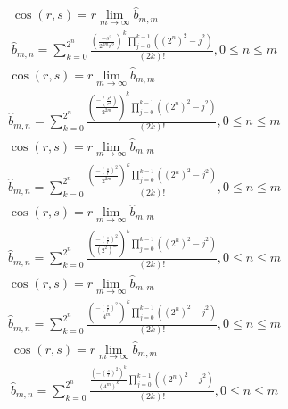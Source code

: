 \documentclass[a4paper,12pt]{report}
\begin{document}
\begin{subequations}
\begin{gather}
\cos(r,s) = r \lim \limits_{m \to \infty} \hat{b}_{m,m} \\
\hat{b}_{m,n} = \sum \limits_{k=0}^{2^n} \frac{\left(\frac{-s^2}{2^{2m}r^2}\right)^k \prod \limits_{j=0}^{k-1} ((2^n)^2 - j^2)}{(2k)!}, 0 \leq n \leq m
\end{gather}
\end{subequations}
\begin{subequations}
\begin{gather}
\cos(r,s) = r \lim \limits_{m \to \infty} \hat{b}_{m,m} \\
\hat{b}_{m,n} = \sum \limits_{k=0}^{2^n} \frac{\left(\frac{-\left(\frac{s^2}{r^2}\right)}{2^{2m}}\right)^k \prod \limits_{j=0}^{k-1} ((2^n)^2 - j^2)}{(2k)!}, 0 \leq n \leq m
\end{gather}
\end{subequations}
\begin{subequations}
\begin{gather}
\cos(r,s) = r \lim \limits_{m \to \infty} \hat{b}_{m,m} \\
\hat{b}_{m,n} = \sum \limits_{k=0}^{2^n} \frac{\left(\frac{-\left(\frac{s}{r}\right)^2}{2^{2m}}\right)^k \prod \limits_{j=0}^{k-1} ((2^n)^2 - j^2)}{(2k)!}, 0 \leq n \leq m
\end{gather}
\end{subequations}
\begin{subequations}
\begin{gather}
\cos(r,s) = r \lim \limits_{m \to \infty} \hat{b}_{m,m} \\
\hat{b}_{m,n} = \sum \limits_{k=0}^{2^n} \frac{\left(\frac{-\left(\frac{s}{r}\right)^2}{(2^2)^m}\right)^k \prod \limits_{j=0}^{k-1} ((2^n)^2 - j^2)}{(2k)!}, 0 \leq n \leq m
\end{gather}
\end{subequations}
\begin{subequations}
\begin{gather}
\cos(r,s) = r \lim \limits_{m \to \infty} \hat{b}_{m,m} \\
\hat{b}_{m,n} = \sum \limits_{k=0}^{2^n} \frac{\left(\frac{-\left(\frac{s}{r}\right)^2}{4^m}\right)^k \prod \limits_{j=0}^{k-1} ((2^n)^2 - j^2)}{(2k)!}, 0 \leq n \leq m
\end{gather}
\end{subequations}
\begin{subequations}
\begin{gather}
\cos(r,s) = r \lim \limits_{m \to \infty} \hat{b}_{m,m} \\
\hat{b}_{m,n} = \sum \limits_{k=0}^{2^n} \frac{\frac{\left(-\left(\frac{s}{r}\right)^2\right)^k}{(4^m)^k} \prod \limits_{j=0}^{k-1} ((2^n)^2 - j^2)}{(2k)!}, 0 \leq n \leq m
\end{gather}
\end{subequations}
\end{document}
